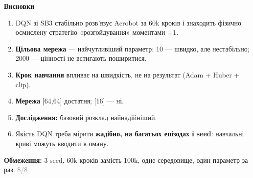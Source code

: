 \documentclass[10pt]{article}
\newcommand{\slidetitle}[1]{{\color{acc}\Large\bfseries #1}\par\vspace{1mm}{\color{acc}\rule{\linewidth}{1pt}}\par\vspace{2.5mm}}
\newcommand{\num}[2]{\hfill\textcolor{gray}{\footnotesize #1/#2}}
\begin{document}
\slidetitle{Висновки}
\begin{enumerate}
\item DQN зі SB3 стабільно розв'язує Acrobot за 60k кроків і знаходить фізично осмислену стратегію «розгойдування» моментами $\pm1$.
\item \textbf{Цільова мережа} — найчутливіший параметр: 10 — швидко, але нестабільно; 2000 — цінності не встигають поширитися.
\item \textbf{Крок навчання} впливає на швидкість, не на результат (Adam + Huber + clip).
\item \textbf{Мережа} [64,64] достатня; [16] — ні.
\item \textbf{Дослідження:} базовий розклад найнадійніший.
\item Якість DQN треба мірити \textbf{жадібно, на багатьох епізодах і seed}: навчальні криві можуть вводити в оману.
\end{enumerate}\vspace{2mm}
{\small\textbf{Обмеження:} 3 seed, 60k кроків замість 100k, одне середовище, один параметр за раз.}
\vfill\num{8}{8}
\end{document}
